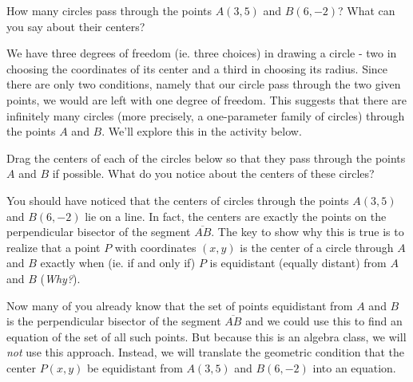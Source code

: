 \documentclass{ximera}
\begin{document}
\begin{example}  \label{Ex5}
How many circles pass through the points $A(3,5)$ and $B(6,-2)$? What can you say about their centers?

\begin{explanation}
We have three degrees of freedom (ie. three choices) in drawing a circle - two in choosing the coordinates of its center and a third in choosing its radius. Since there are only two conditions, namely that our circle pass through the two given points, we would are left with one degree of freedom. This suggests that there are infinitely many circles (more precisely, a one-parameter family of circles) through the points $A$ and $B$. We'll explore this in the activity below. 


\begin{exploration}\label{exp:circle1}
Drag the centers of each of the circles below so that they pass through the points $A$ and $B$ if possible. What do you notice about the centers of these circles?
 
 
\begin{onlineOnly}
    \begin{center}
\end{center}
\end{onlineOnly}
\end{exploration}

You should have noticed that the centers of circles through the points $A(3,5)$ and $B(6,-2)$ lie on a line. In fact, the centers are exactly the points on the perpendicular bisector of the segment $\overline{AB}$. The key to show why this is true is to realize that a point $P$ with coordinates $(x,y)$ is the center of a circle through $A$ and $B$ exactly when (ie. if and only if) $P$ is equidistant (equally distant) from $A$ and $B$ (\emph{Why?}). 

Now many of you already know that the set of points equidistant from $A$ and $B$ is the perpendicular bisector of the segment $\overline{AB}$ and we could use this to find an equation of the set of all such points. But because this is an algebra class, we will \emph{not} use this approach. Instead, we will translate the geometric condition that the center $P(x,y)$ be equidistant from $A(3,5)$ and $B(6,-2)$ into an equation.


\end{explanation}
\end{example}
\end{document}
